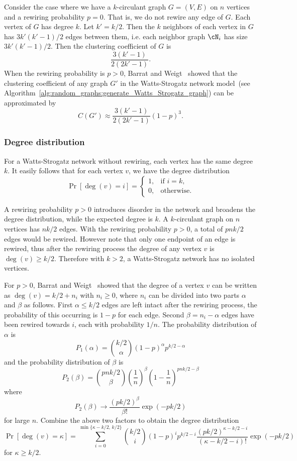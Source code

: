 Consider the case where we have a $k$-circulant graph
$G = (V,E)$ on $n$ vertices and a rewiring probability $p = 0$. That
is, we do not rewire any edge of $G$. Each vertex of $G$ has degree
$k$. Let  $k' = k/2$. Then the $k$ neighbors of each vertex in $G$ has
$3k' (k' - 1) / 2$ edges between them, i.e. each neighbor graph
$\cN_i$ has size $3k' (k' - 1) / 2$. Then the clustering coefficient
of $G$ is
\[
\frac{3(k' - 1)} {2(2k' - 1)}.
\]
When the rewiring probability is $p > 0$, Barrat and
Weigt~\cite{BarratWeigt2000} showed that the clustering coefficient of
any graph $G'$ in the Watts-Strogatz network model~(see
Algorithm~\ref{alg:random_graphs:generate_Watts_Strogatz_graph}) can
be approximated by
\[
C(G')
\approx
\frac{3(k' - 1)} {2(2k' - 1)} (1 - p)^3.
\]



\subsubsection{Degree distribution}

For a Watts-Strogatz network without rewiring, each vertex has the
same degree $k$. It easily follows that for each vertex $v$, we have
the degree distribution
\[
\Pr[\deg(v) = i]
=
\begin{cases}
1, & \text{if $i = k$}, \\[4pt]
0, & \text{otherwise}.
\end{cases}
\]

A rewiring probability $p > 0$ introduces disorder in the network and
broadens the degree distribution, while the expected degree is $k$. A
$k$-circulant graph on $n$ vertices has $nk / 2$ edges. With the
rewiring probability $p > 0$, a total of $pnk / 2$ edges would be
rewired. However note that only one endpoint of an edge is rewired,
thus after the rewiring process the degree of any vertex $v$ is
$\deg(v) \geq k/2$. Therefore with $ k > 2$, a Watts-Strogatz network
has no isolated vertices.

For $p > 0$, Barrat and Weigt~\cite{BarratWeigt2000} showed that the
degree of a vertex $v$ can be written as $\deg(v) = k/2 + n_i$ with
$n_i \geq 0$, where $n_i$ can be divided into two parts $\alpha$ and
$\beta$ as follows. First $\alpha \leq k/2$ edges are left intact
after the rewiring process, the probability of this occurring is
$1 - p$ for each edge. Second $\beta = n_i - \alpha$ edges have been
rewired towards $i$, each with probability $1/n$. The probability
distribution of $\alpha$ is
\[
P_1(\alpha)
=
\binom{k/2}{\alpha} (1 - p)^\alpha p^{k/2 - \alpha}
\]
and the probability distribution of $\beta$ is
\[
P_2(\beta)
=
\binom{pnk/2}{\beta} \left( \frac{1}{n} \right)^\beta
\left( 1 - \frac{1}{n} \right)^{pnk/2 - \beta}
\]
where
\[
P_2(\beta)
\to
\frac{(pk/2)^\beta}{\beta!} \exp(-pk/2)
\]
for large $n$. Combine the above two factors to obtain the degree
distribution
\[
\Pr[\deg(v) = \kappa]
=
\sum_{i=0}^{\min\{\kappa - k/2,\, k/2\}}
\binom{k/2}{i} (1 - p)^i p^{k/2 - i}
\frac{(pk/2)^{\kappa - k/2 - i}} {(\kappa - k/2 - i)!}
\exp(-pk/2)
\]
for $\kappa \geq k/2$.


